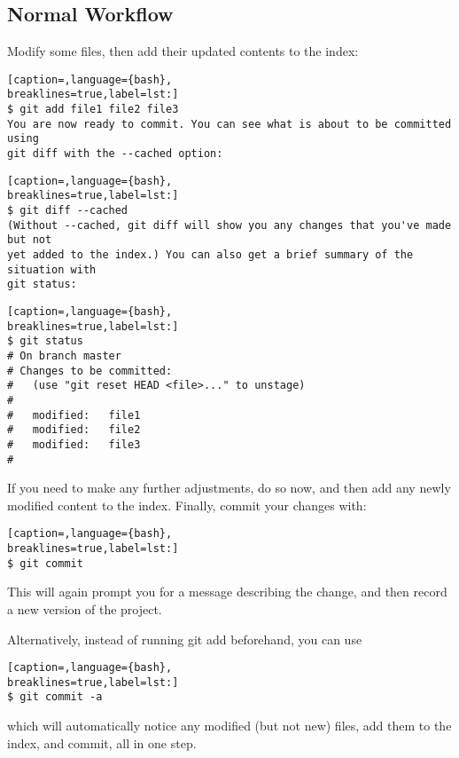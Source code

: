 \subsection{Normal Workflow}
Modify some files, then add their updated contents to the index:
\lstset{basicstyle=\scriptsize, numbers=none, captionpos=b, tabsize=4}
\begin{lstlisting}[caption=,language={bash},
breaklines=true,label=lst:]
$ git add file1 file2 file3
You are now ready to commit. You can see what is about to be committed using
git diff with the --cached option:
\end{lstlisting}

\lstset{basicstyle=\scriptsize, numbers=none, captionpos=b, tabsize=4}
\begin{lstlisting}[caption=,language={bash},
breaklines=true,label=lst:]
$ git diff --cached
(Without --cached, git diff will show you any changes that you've made but not
yet added to the index.) You can also get a brief summary of the situation with
git status:
\end{lstlisting}

\lstset{basicstyle=\scriptsize, numbers=none, captionpos=b, tabsize=4}
\begin{lstlisting}[caption=,language={bash},
breaklines=true,label=lst:]
$ git status
# On branch master
# Changes to be committed:
#   (use "git reset HEAD <file>..." to unstage)
#
#   modified:   file1
#   modified:   file2
#   modified:   file3
#
\end{lstlisting}

If you need to make any further adjustments, do so now, and then add any newly
modified content to the index. Finally, commit your changes with:
\lstset{basicstyle=\scriptsize, numbers=none, captionpos=b, tabsize=4}
\begin{lstlisting}[caption=,language={bash},
breaklines=true,label=lst:]
$ git commit
\end{lstlisting}

This will again prompt you for a message describing the change, and then record
a new version of the project.

Alternatively, instead of running git add beforehand, you can use
\lstset{basicstyle=\scriptsize, numbers=none, captionpos=b, tabsize=4}
\begin{lstlisting}[caption=,language={bash},
breaklines=true,label=lst:]
$ git commit -a
\end{lstlisting}

which will automatically notice any modified (but not new) files, add them to
the index, and commit, all in one step.

